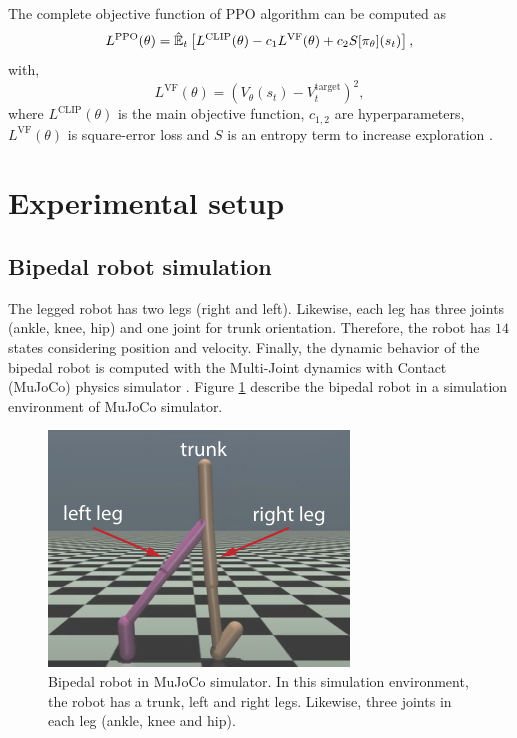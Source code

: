 The complete objective function of PPO algorithm can be computed as
\begin{equation*}
	L^{\mathrm{PPO}}(\theta) = \hat{\mathbb{E}}_{t} \left[  L^{\mathrm{CLIP}}(\theta) - c_1 L^{\mathrm{VF}}(\theta)  + c_2 S[\pi_\theta](s_t)  \right],			
\end{equation*}	
with,
\begin{equation*}
	L^{\mathrm{VF}}(\theta) = \left( V_\theta (s_t) - V^{\mathrm{target}}_{t}  \right)^{2},	
\end{equation*}			
\noindent where $L^{\mathrm{CLIP}}(\theta)$ is the main objective function, $c_{1,2}$ are hyperparameters, $L^{\mathrm{VF}}(\theta)$ is square-error loss and $S$ is an entropy term to increase exploration \cite{schulman2017proximal}.

\section{Experimental setup}

\subsection{Bipedal robot simulation}
The legged robot has two legs (right and left). Likewise, each leg has three joints (ankle, knee, hip) and one joint for trunk orientation. Therefore, the robot has $14$ states considering position and velocity. Finally, the dynamic behavior of the bipedal robot is computed with the Multi-Joint dynamics with Contact (MuJoCo) physics simulator \cite{todorov2012mujoco}. Figure \ref{fig:bipedal_robot} describe the bipedal robot in a simulation environment of MuJoCo simulator.

\begin{figure}
	\centering
	\includegraphics{bipedal_robot.pdf}
	\caption{Bipedal robot in MuJoCo simulator. In this simulation environment, the robot has a trunk, left and right legs. Likewise, three joints in each leg (ankle, knee and hip).}
	\label{fig:bipedal_robot}
\end{figure}	

